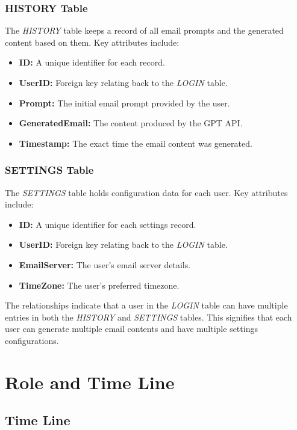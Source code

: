 \documentclass[12pt]{article}
\begin{document}
\subsubsection{HISTORY Table}
The \textit{HISTORY} table keeps a record of all email prompts and the generated content based on them. Key attributes include:
\begin{itemize}
	\item \textbf{ID:} A unique identifier for each record.
	\item \textbf{UserID:} Foreign key relating back to the \textit{LOGIN} table.
	\item \textbf{Prompt:} The initial email prompt provided by the user.
	\item \textbf{GeneratedEmail:} The content produced by the GPT API.
	\item \textbf{Timestamp:} The exact time the email content was generated.
\end{itemize}

\subsubsection{SETTINGS Table}
The \textit{SETTINGS} table holds configuration data for each user. Key attributes include:
\begin{itemize}
	\item \textbf{ID:} A unique identifier for each settings record.
	\item \textbf{UserID:} Foreign key relating back to the \textit{LOGIN} table.
	\item \textbf{EmailServer:} The user's email server details.
	\item \textbf{TimeZone:} The user's preferred timezone.
\end{itemize}

The relationships indicate that a user in the \textit{LOGIN} table can have multiple entries in both the \textit{HISTORY} and \textit{SETTINGS} tables. This signifies that each user can generate multiple email contents and have multiple settings configurations.

\section{Role and Time Line}

\subsection{Time Line}
\end{document}
